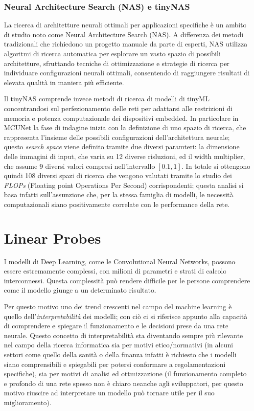 \subsubsection{Neural Architecture Search (NAS) e tinyNAS}

La ricerca di architetture neurali ottimali per applicazioni specifiche è un ambito di studio noto come Neural Architecture Search (NAS). A differenza dei metodi tradizionali che richiedono un progetto manuale da parte di esperti, NAS utilizza algoritmi di ricerca automatica per esplorare un vasto spazio di possibili architetture, sfruttando tecniche di ottimizzazione e strategie di ricerca per individuare configurazioni neurali ottimali, consentendo di raggiungere risultati di elevata qualità in maniera più efficiente.

Il tinyNAS comprende invece metodi di ricerca di modelli di tinyML concentrandosi sul perfezionamento delle reti per adattarsi alle restrizioni di memoria e potenza computazionale dei dispositivi embedded.
In particolare in MCUNet la fase di indagine inizia con la definizione di uno spazio di ricerca, che rappresenta l'insieme delle possibili configurazioni dell'architettura neurale; questo \textit{search space} viene definito tramite due diversi paramteri: la dimensione delle immagini di input, che varia su 12 diverse risluzioni, ed il width multiplier, che assume 9 diversi valori compresi nell'intervallo $[0.1, 1]$. In totale si ottengono quindi 108 diversi spazi di ricerca che vengono valutati tramite lo studio dei \textit{FLOPs} (Floating point Operations Per Second) corrispondenti; questa analisi si basa infatti sull'assunzione che, per la stessa famiglia di modelli, le necessità computazionali siano positivamente correlate con le performance della rete.

\section{Linear Probes}
\label{sec:probes}

I modelli di Deep Learning, come le Convolutional Neural Networks, possono essere estremamente complessi, con milioni di parametri e strati di calcolo interconnessi. Questa complessità può rendere difficile per le persone comprendere come il modello giunge a un determinato risultato.

Per questo motivo uno dei trend crescenti nel campo del machine learning è quello dell'\textit{interpretabilità} dei modelli; con ciò ci si riferisce appunto alla capacità di comprendere e spiegare il funzionamento e le decisioni prese da una rete neurale. Questo concetto di interpretabilità sta diventando sempre più rilevante nel campo della ricerca informatica sia per motivi etico/normativi (in alcuni settori come quello della sanità o della finanza infatti è richiesto che i modelli siano comprensibili e spiegabili per potersi conformare a regolamentazioni specifiche), sia per motivi di analisi ed ottmizzazione (il funzionamento completo e profondo di una rete spesso non è chiaro neanche agli sviluppatori, per questo motivo riuscire ad interpretare un modello può tornare utile per il suo miglioramento).

